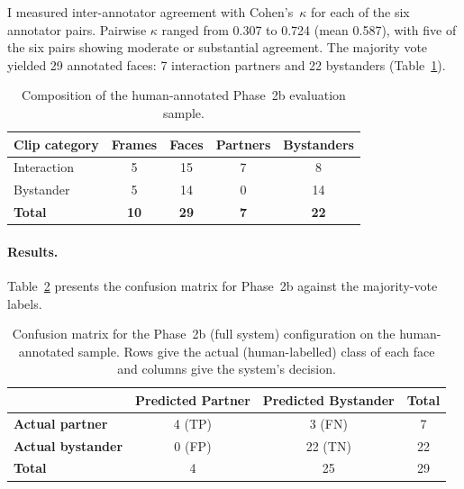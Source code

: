 I measured inter-annotator agreement with Cohen's~$\kappa$ for each of the six
annotator pairs. Pairwise $\kappa$ ranged from 0.307 to 0.724 (mean 0.587), with
five of the six pairs showing moderate or substantial agreement. The majority vote
yielded 29 annotated faces: 7 interaction partners and 22 bystanders
(Table~\ref{tab:sample_2b}).

\begin{table}[htbp]
\begin{singlespace}
\centering
\caption{Composition of the human-annotated Phase~2b evaluation sample.}
\label{tab:sample_2b}
\renewcommand{\arraystretch}{1.3}
\begin{tabular}{@{}lcccc@{}}
\toprule
\textbf{Clip category} & \textbf{Frames} & \textbf{Faces} & \textbf{Partners} & \textbf{Bystanders} \\
\midrule
Interaction & 5  & 15 & 7 & 8  \\
Bystander   & 5  & 14 & 0 & 14 \\
\midrule
\textbf{Total} & \textbf{10} & \textbf{29} & \textbf{7} & \textbf{22} \\
\bottomrule
\end{tabular}
\end{singlespace}
\end{table}

\paragraph{Results.}
Table~\ref{tab:confusion_2b} presents the confusion matrix for Phase~2b against the
majority-vote labels.

\begin{table}[htbp]
\begin{singlespace}
\centering
\caption{Confusion matrix for the Phase~2b (full system) configuration on the
human-annotated sample. Rows give the actual (human-labelled) class of each face and
columns give the system's decision.}
\label{tab:confusion_2b}
\renewcommand{\arraystretch}{1.3}
\begin{tabular}{@{}lccc@{}}
\toprule
 & \textbf{Predicted Partner} & \textbf{Predicted Bystander} & \textbf{Total} \\
\midrule
\textbf{Actual partner}   & 4 (TP) & 3 (FN)  & 7 \\
\textbf{Actual bystander} & 0 (FP) & 22 (TN) & 22 \\
\textbf{Total}        & 4      & 25      & 29 \\
\bottomrule
\end{tabular}
\end{singlespace}
\end{table}

